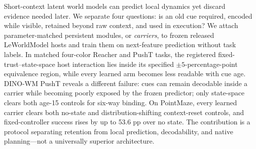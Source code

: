 Short-context latent world models can predict local dynamics yet discard
evidence needed later. We separate four questions: is an old cue required,
encoded while visible, retained beyond raw context, and used in execution? We
attach parameter-matched persistent modules, or \emph{carriers}, to frozen
released LeWorldModel hosts and train them on next-feature prediction without
task labels. In matched four-color Reacher and PushT tasks, the registered
fixed-trust--state-space host interaction lies inside its specified
$\pm5$-percentage-point equivalence region, while every learned arm becomes
less readable with cue age. DINO-WM
PushT reveals a different failure: cues can remain decodable inside a carrier
while becoming poorly exposed by the frozen predictor; only state-space clears
both age-15 controls for six-way binding. On PointMaze, every learned carrier
clears both no-state and distribution-shifting context-reset controls, and
fixed-controller success rises by up to 53.6 pp over no state.
The contribution is a protocol separating retention from local prediction,
decodability, and native planning---not a universally superior architecture.
